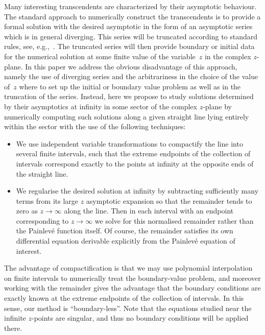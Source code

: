\documentclass[pdftex]{sigma}
\begin{document}
Many interesting transcendents are characterized by their asymptotic behaviour. The standard approach to numerically construct the transcendents is to provide a formal solution with the desired asymptotic in the form of an asymptotic series which is in general diverging. This series will be truncated according to standard rules, see, e.g.,~\cite{GR}. The truncated series will then provide boundary or initial data for the numerical solution at some finite value of the variable~$z$ in the complex $z$-plane. In this paper we address the obvious disadvantage of this approach, namely the use of diverging series and the arbitrariness in the choice of the value of~$z$ where to set up the initial or boundary value problem as well as in the truncation of the series. Instead, here we propose to study solutions determined by their asymptotics at infinity in some sector of the complex $z$-plane by numerically computing such solutions along a given straight line lying entirely within the sector with the use of the following techniques:
\begin{itemize}\itemsep=0pt
\item We use independent variable transformations to compactify the line into several finite intervals, such that the extreme endpoints of the collection of intervals correspond exactly to the points at infinity at the opposite ends of the straight line.

\item We regularise the desired solution at infinity by subtracting sufficiently many terms from its large $z$ asymptotic expansion so that the remainder tends to zero as $z \to \infty$ along the line. Then in each interval with an endpoint corresponding to $z\to \infty$ we solve for this normalised remainder rather than the Painlev\'e function itself. Of course, the remainder satisfies its own differential equation derivable explicitly from the Painlev\'e equation of interest.
\end{itemize}
The advantage of compactification is that we may use polynomial interpolation on finite intervals to numerically treat the boundary-value problem, and moreover working with the remainder gives the advantage that the boundary conditions are exactly known at the extreme endpoints of the collection of intervals. In this sense, our method is ``boundary-less''. Note that the equations studied near the infinite $z$-points are singular, and thus no boundary conditions will be applied there.
\end{document}
